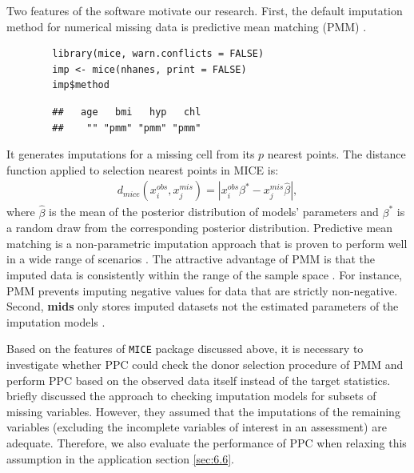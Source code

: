	Two features of the software motivate our research. First, the default imputation method for numerical missing data is predictive mean matching (PMM) \citep{little1988missing}.
	\begin{lstlisting}
		library(mice, warn.conflicts = FALSE)
		imp <- mice(nhanes, print = FALSE)
		imp$method
	\end{lstlisting}
	\begin{verbatim}
		##   age   bmi   hyp   chl 
		##    "" "pmm" "pmm" "pmm"
	\end{verbatim}
	It generates imputations for a missing cell from its $p$ nearest points. The distance function applied to selection nearest points in MICE is:
	\begin{equation}
		\begin{array}{ll}
			d_{mice}(x_{i}^{obs}, x_{j}^{mis}) = |x_{i}^{obs}\beta^{*} - x_{j}^{mis}\hat{\beta}|,
		\end{array} 
	\end{equation}
	where $\hat{\beta}$ is the mean of the posterior distribution of models' parameters and $\beta^{*}$ is a random draw from the corresponding posterior distribution. Predictive mean matching is a non-parametric imputation approach that is proven to perform well in a wide range of scenarios \citep{de2011handbook, siddique2008multiple, su2011multiple, Buuren2018, Buuren2011, Vink2014, white2011multiple, Vink2015, yu2007evaluation}. The attractive advantage of PMM is that the imputed data is consistently within the range of the sample space \citep{heeringa2001multivariate, Buuren2018, Vink2014, Vink2015, white2011multiple, yu2007evaluation}. For instance, PMM prevents imputing negative values for data that are strictly non-negative. Second, \textbf{mids} only stores imputed datasets not the estimated parameters of the imputation models \citep{hoogland2020handling}. 
	
	Based on the features of \texttt{MICE} package discussed above, it is necessary to investigate whether PPC could check the donor selection procedure of PMM and perform PPC based on the observed data itself instead of the target statistics. \citet{he2012diagnosing} briefly discussed the approach to checking imputation models for subsets of missing variables. However, they assumed that the imputations of the remaining variables (excluding the incomplete variables of interest in an assessment) are adequate. Therefore, we also evaluate the performance of PPC when relaxing this assumption in the application section \ref{sec:6.6}.      
	
